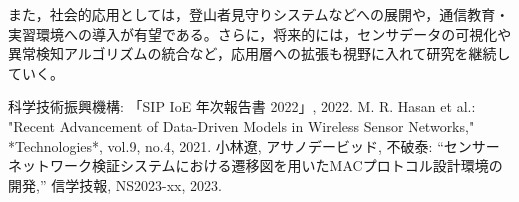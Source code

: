 \documentclass[paper]{ieicej}
\begin{document}
また，社会的応用としては，登山者見守りシステムなどへの展開や，通信教育・実習環境への導入が有望である。さらに，将来的には，センサデータの可視化や異常検知アルゴリズムの統合など，応用層への拡張も視野に入れて研究を継続していく。


\baselineskip
%
%

\begin{thebibliography}{99}
 科学技術振興機構: 「SIP IoE 年次報告書 2022」, 2022.
 M. R. Hasan et al.: "Recent Advancement of Data-Driven Models in Wireless Sensor Networks," *Technologies*, vol.9, no.4, 2021.
 小林遼, アサノデービッド, 不破泰:
“センサーネットワーク検証システムにおける遷移図を用いたMACプロトコル設計環境の開発,”
信学技報, NS2023-xx, 2023.

\end{thebibliography}
\end{document}
